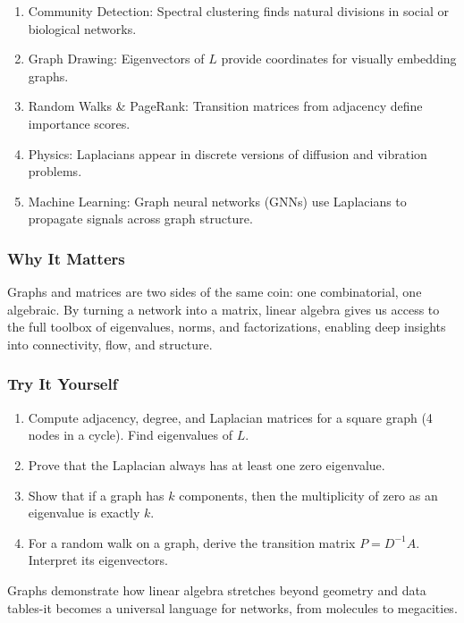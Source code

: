 \documentclass[
  letterpaper,
  DIV=11,
  numbers=noendperiod]{scrreprt}
\providecommand{\tightlist}{%
  \setlength{\itemsep}{0pt}\setlength{\parskip}{0pt}}
\begin{document}
\begin{enumerate}
\def\labelenumi{\arabic{enumi}.}
\tightlist
\item
  Community Detection: Spectral clustering finds natural divisions in
  social or biological networks.
\item
  Graph Drawing: Eigenvectors of \(L\) provide coordinates for visually
  embedding graphs.
\item
  Random Walks \& PageRank: Transition matrices from adjacency define
  importance scores.
\item
  Physics: Laplacians appear in discrete versions of diffusion and
  vibration problems.
\item
  Machine Learning: Graph neural networks (GNNs) use Laplacians to
  propagate signals across graph structure.
\end{enumerate}

\subsubsection{Why It Matters}\label{why-it-matters-88}

Graphs and matrices are two sides of the same coin: one combinatorial,
one algebraic. By turning a network into a matrix, linear algebra gives
us access to the full toolbox of eigenvalues, norms, and factorizations,
enabling deep insights into connectivity, flow, and structure.

\subsubsection{Try It Yourself}\label{try-it-yourself-92}

\begin{enumerate}
\def\labelenumi{\arabic{enumi}.}
\tightlist
\item
  Compute adjacency, degree, and Laplacian matrices for a square graph
  (4 nodes in a cycle). Find eigenvalues of \(L\).
\item
  Prove that the Laplacian always has at least one zero eigenvalue.
\item
  Show that if a graph has \(k\) components, then the multiplicity of
  zero as an eigenvalue is exactly \(k\).
\item
  For a random walk on a graph, derive the transition matrix
  \(P = D^{-1}A\). Interpret its eigenvectors.
\end{enumerate}

Graphs demonstrate how linear algebra stretches beyond geometry and data
tables-it becomes a universal language for networks, from molecules to
megacities.
\end{document}
